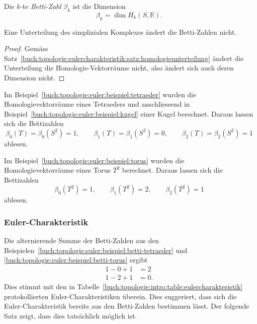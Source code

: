 \begin{definition}
Die $k$-te \emph{Betti-Zahl} $\beta_k$ ist die Dimension
\[
\beta_k
=
\dim H_k(S,\mathbb{R}).
\]
\end{definition}

\begin{satz}
Eine Unterteilung des simplizialen Komplexes ändert die Betti-Zahlen
nicht.
\end{satz}

\begin{proof}
Gemäss Satz~\ref{buch:topologie:eulercharakteristik:satz:homologieunterteilung}
ändert die Unterteilung die Homologie-Vektorräume nicht, also ändert sich
auch deren Dimension nicht.
\end{proof}

\begin{beispiel}
\label{buch:topologie:euler:beispiel:betti-tetraeder}
Im Beispiel~\ref{buch:topologie:euler:beispiel:tetraeder} wurden die 
Homologievektorräume eines Tetraeders und anschliessend in
Beispiel~\ref{buch:topologie:euler:beispiel:kugel} einer Kugel berechnet.
Daraus lassen sich die Bettizahlen
\[
\beta_0(T) = \beta_0(S^2) = 1,\qquad
\beta_1(T) = \beta_1(S^2) = 0,\qquad
\beta_2(T) = \beta_2(S^2) = 1
\]
ablesen.
\end{beispiel}

\begin{beispiel}
\label{buch:topologie:euler:beispiel:betti-torus}
Im Beispiel~\ref{buch:topologie:euler:beispiel:torus} wurden die 
Homologievektorräume eines Torus $T^2$ berechnet.
Daraus lassen sich die Bettizahlen
\[
\beta_0(T^2) = 1,\qquad
\beta_1(T^2) = 2,\qquad
\beta_2(T^2) = 1
\]
ablesen.
\end{beispiel}

%
%
\subsubsection{Euler-Charakteristik}
Die alternierende Summe der Betti-Zahlen aus den
Beispielen~\ref{buch:topologie:euler:beispiel:betti-tetraeder}
und \ref{buch:topologie:euler:beispiel:betti-torus} ergibt
\begin{align*}
1-0+1 &= 2 \\
1-2+1 &= 0.
\end{align*}
Dies stimmt mit den in
Tabelle~\ref{buch:topologie:intro:table:eulercharakteristik}
protokollierten Euler-Charakteristiken überein.
Dies suggeriert, dass sich die Euler-Charakteristik bereits aus
den Betti-Zahlen bestimmen lässt.
Der folgende Satz zeigt, dass dies tatsächlich möglich ist.

